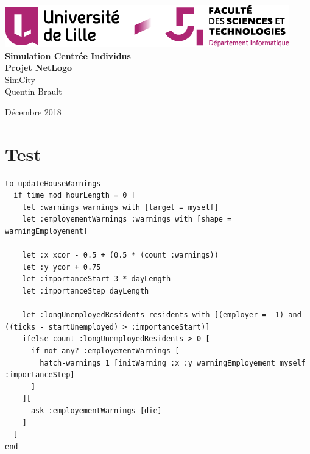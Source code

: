 \documentclass[11pt]{report}
\begin{document}
\begin{titlepage}
	\centering
	\includegraphics[scale=0.8]{logo}\\
	\vspace{5cm}
	{\Huge{ \bf{Simulation Centrée Individus}}}\\
	\vspace{0.5cm}
   	{\Huge{\bf {Projet NetLogo}}}\\
	\vspace{2cm}
   	{\huge{SimCity}}\\
	\vspace{3cm}
   	{\large{Quentin Brault}}
	\vfill
	{\large Décembre 2018\par}
\end{titlepage}

\listoftodos
\newpage

\tableofcontents
\newpage

\chapter*{Test}

\begin{verbatim}
to updateHouseWarnings
  if time mod hourLength = 0 [
    let :warnings warnings with [target = myself]
    let :employementWarnings :warnings with [shape = warningEmployement]
    
    let :x xcor - 0.5 + (0.5 * (count :warnings))
    let :y ycor + 0.75
    let :importanceStart 3 * dayLength
    let :importanceStep dayLength
    
    let :longUnemployedResidents residents with [(employer = -1) and ((ticks - startUnemployed) > :importanceStart)]
    ifelse count :longUnemployedResidents > 0 [
      if not any? :employementWarnings [
        hatch-warnings 1 [initWarning :x :y warningEmployement myself :importanceStep]
      ]
    ][
      ask :employementWarnings [die]
    ]
  ]
end
\end{verbatim}


\end{document}
